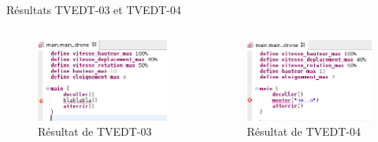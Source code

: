 \documentclass{bredelebeamer}
\begin{document}
\begin{frame}{Résultats TVEDT-03 et TVEDT-04} 
\begin{columns}
\begin{column}{0.5\textwidth}
\begin{figure}
\centering
\includegraphics[scale=0.4]{images/TVEDT-03.png}
\caption{Résultat de TVEDT-03}
\end{figure}
\end{column}
\begin{column}{0.5\textwidth}
\begin{figure}
\centering
\includegraphics[scale=0.4]{images/TVEDT-04.png}
\caption{Résultat de TVEDT-04}
\end{figure}
\end{column}
\end{columns}
\end{frame}
\end{document}
